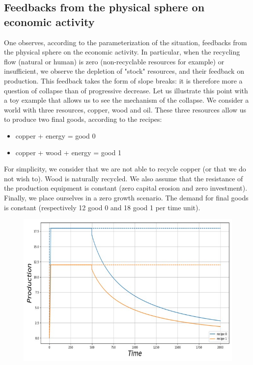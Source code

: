 \documentclass[12pt,a4paper]{article}%
\begin{document}
\begin{appendix}
\subsection{Feedbacks from the physical sphere on economic activity} 
One observes, according to the parameterization of the situation, feedbacks from the physical sphere on the economic activity. In particular, when the recycling flow (natural or human) is zero (non-recyclable resources for example) or insufficient, we observe the depletion of "stock" resources, and their feedback on production. This feedback takes the form of slope breaks: it is therefore more a question of collapse than of progressive decrease. Let us illustrate this point with a toy example that allows us to see the mechanism of the collapse.  We consider a world with three resources, copper, wood and oil. These three resources allow us to produce two final goods, according to the recipes:  
\begin{itemize}
	\item copper + energy = good 0
	\item copper + wood + energy = good 1
\end{itemize} 
For simplicity, we consider that we are not able to recycle copper (or that we do not wish to). Wood is naturally recycled. We also assume that the resistance of the production equipment is constant (zero capital erosion and zero investment). Finally, we place ourselves in a zero growth scenario. The demand for final goods is constant (respectively 12 good 0 and 18 good 1 per time unit).  
\begin{figure}[h] 
	\centering \includegraphics[width=1.0\textwidth]{figures/Production7.jpg}
\end{figure} 

\end{appendix}
\end{document}
